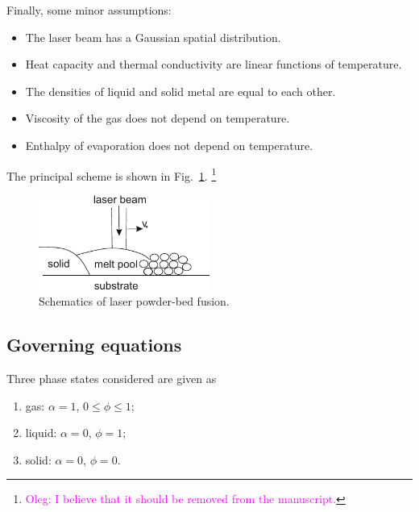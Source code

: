 \documentclass{article}
\newcommand{\oleg}[1]{\textcolor{magenta}{\footnote{\textcolor{magenta}{Oleg: #1}}}} %
\begin{document}
Finally, some minor assumptions:
\begin{itemize}
    \item The laser beam has a Gaussian spatial distribution.
    \item Heat capacity and thermal conductivity are linear functions of temperature.
    \item The densities of liquid and solid metal are equal to each other.
    \item Viscosity of the gas does not depend on temperature.
    \item Enthalpy of evaporation does not depend on temperature.
\end{itemize}

The principal scheme is shown in Fig.~\ref{fig:scheme}.
\oleg{I believe that it should be removed from the manuscript.}
\begin{figure}
    \centering
    \includegraphics[width = 0.5\textwidth]{scheme}
    \caption{
        Schematics of laser powder-bed fusion.
    }\label{fig:scheme}
\end{figure}

\subsection{Governing equations}

Three phase states considered are given as
\begin{enumerate}[label=\arabic*)]
    \item gas: $\alpha=1$, $0\leq\phi\leq1$;
    \item liquid: $\alpha=0$, $\phi=1$;
    \item solid: $\alpha=0$, $\phi=0$.
\end{enumerate}
\end{document}
